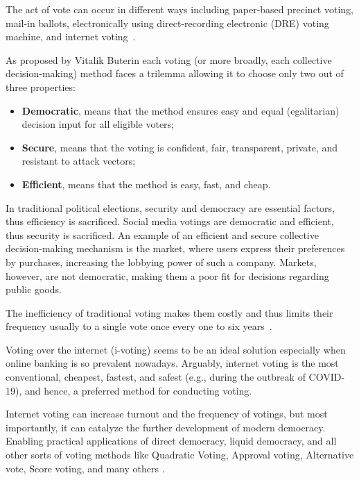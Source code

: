 \documentclass[runningheads]{llncs}
\begin{document}
The act of vote can occur in different ways including paper-based precinct voting, mail-in ballots, electronically using direct-recording electronic (DRE) voting machine, and internet voting~\cite{parkGoingBadWorse2021}.

As proposed by Vitalik Buterin\cite{buterinBlockchainVotingOverrated2021} each voting (or more broadly, each collective decision-making) method faces a trilemma allowing it to choose only two out of three properties:

\begin{itemize}
    \item \textbf{Democratic}, means that the method ensures easy and equal (egalitarian) decision input for all eligible voters;
    \item \textbf{Secure}, means that the voting is confident, fair, transparent, private, and resistant to attack vectors;
    \item \textbf{Efficient}, means that the method is easy, fast, and cheap.
\end{itemize}

In traditional political elections, security and democracy are essential factors, thus efficiency is sacrificed. Social media votings are democratic and efficient, thus security is sacrificed. An example of an efficient and secure collective decision-making mechanism is the market, where users express their preferences by purchases, increasing the lobbying power of such a company. Markets, however, are not democratic, making them a poor fit for decisions regarding public goods. 

The inefficiency of traditional voting makes them costly and thus limits their frequency usually to a single vote once every one to six years~\cite{buterinBlockchainVotingOverrated2021}.

Voting over the internet (i-voting) seems to be an ideal solution especially when online banking is so prevalent nowadays. Arguably, internet voting is the most conventional, cheapest, fastest, and safest (e.g., during the outbreak of COVID-19), and hence, a preferred method for conducting voting.

Internet voting can increase turnout and the frequency of votings, but most importantly, it can catalyze the further development of modern democracy. Enabling practical applications of direct democracy, liquid democracy, and all other sorts of voting methods like Quadratic Voting, Approval voting, Alternative vote, Score voting, and many others \cite{laslierLoserPluralityVoting2011}.
\end{document}
